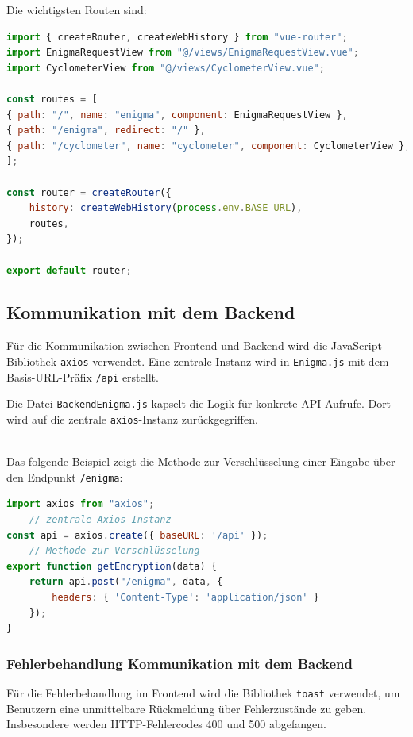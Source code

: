 \documentclass[12pt, ngerman, a4paper, numbers=noenddot]{article}
\begin{document}
Die wichtigsten Routen sind:

\begin{lstlisting}[language=JavaScript, caption=Vue Router Konfiguration]
import { createRouter, createWebHistory } from "vue-router";
import EnigmaRequestView from "@/views/EnigmaRequestView.vue";
import CyclometerView from "@/views/CyclometerView.vue";

const routes = [
{ path: "/", name: "enigma", component: EnigmaRequestView },
{ path: "/enigma", redirect: "/" },
{ path: "/cyclometer", name: "cyclometer", component: CyclometerView },
];

const router = createRouter({
	history: createWebHistory(process.env.BASE_URL),
	routes,
});

export default router;
\end{lstlisting}


\subsection{Kommunikation mit dem Backend}

Für die Kommunikation zwischen Frontend und Backend wird die JavaScript-Bibliothek \lstinline|axios| verwendet. Eine zentrale Instanz wird in \lstinline|Enigma.js| mit dem Basis-URL-Präfix \lstinline|/api| erstellt.

Die Datei \lstinline|BackendEnigma.js| kapselt die Logik für konkrete API-Aufrufe. Dort wird auf die zentrale \lstinline|axios|-Instanz zurückgegriffen. 

\ \\
Das folgende Beispiel zeigt die Methode zur Verschlüsselung einer Eingabe über den Endpunkt \lstinline|/enigma|:

\begin{lstlisting}[language=JavaScript, caption=API-Aufruf in \texttt{BackendEnigma.js}]
import axios from "axios";
	// zentrale Axios-Instanz
const api = axios.create({ baseURL: '/api' });
	// Methode zur Verschlüsselung
export function getEncryption(data) {
	return api.post("/enigma", data, {
		headers: { 'Content-Type': 'application/json' }
	});
}
\end{lstlisting}

\newpage
\subsubsection{Fehlerbehandlung Kommunikation mit dem Backend}

Für die Fehlerbehandlung im Frontend wird die Bibliothek \lstinline|toast| verwendet, um Benutzern eine unmittelbare Rückmeldung über Fehlerzustände zu geben. Insbesondere werden HTTP-Fehlercodes 400 und 500 abgefangen. 
\end{document}
